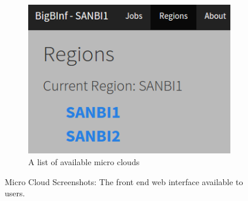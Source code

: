 \documentclass{sig-alternate-05-2015}
\begin{document}
\begin{figure}[t!]
\begin{subfigure}[h]{.5\textwidth}
		\includegraphics[width=\textwidth]{img/screenshotRegions.png}
		\caption{A list of available micro clouds}
		\label{fig:screenshotRegions}
	\end{subfigure}
\caption{Micro Cloud Screenshots: The front end web interface available to users. }
\label{fig:screenshots}
\end{figure}

%
%
%
\end{document}
